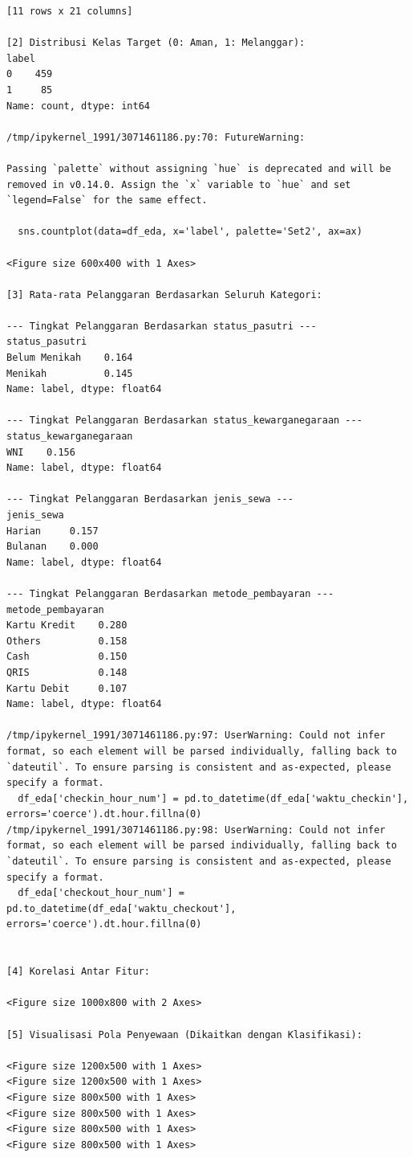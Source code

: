 \begin{lstlisting}[caption={Output 15}]
[11 rows x 21 columns]

[2] Distribusi Kelas Target (0: Aman, 1: Melanggar):
label
0    459
1     85
Name: count, dtype: int64

/tmp/ipykernel_1991/3071461186.py:70: FutureWarning: 

Passing `palette` without assigning `hue` is deprecated and will be removed in v0.14.0. Assign the `x` variable to `hue` and set `legend=False` for the same effect.

  sns.countplot(data=df_eda, x='label', palette='Set2', ax=ax)

<Figure size 600x400 with 1 Axes>

[3] Rata-rata Pelanggaran Berdasarkan Seluruh Kategori:

--- Tingkat Pelanggaran Berdasarkan status_pasutri ---
status_pasutri
Belum Menikah    0.164
Menikah          0.145
Name: label, dtype: float64

--- Tingkat Pelanggaran Berdasarkan status_kewarganegaraan ---
status_kewarganegaraan
WNI    0.156
Name: label, dtype: float64

--- Tingkat Pelanggaran Berdasarkan jenis_sewa ---
jenis_sewa
Harian     0.157
Bulanan    0.000
Name: label, dtype: float64

--- Tingkat Pelanggaran Berdasarkan metode_pembayaran ---
metode_pembayaran
Kartu Kredit    0.280
Others          0.158
Cash            0.150
QRIS            0.148
Kartu Debit     0.107
Name: label, dtype: float64

/tmp/ipykernel_1991/3071461186.py:97: UserWarning: Could not infer format, so each element will be parsed individually, falling back to `dateutil`. To ensure parsing is consistent and as-expected, please specify a format.
  df_eda['checkin_hour_num'] = pd.to_datetime(df_eda['waktu_checkin'], errors='coerce').dt.hour.fillna(0)
/tmp/ipykernel_1991/3071461186.py:98: UserWarning: Could not infer format, so each element will be parsed individually, falling back to `dateutil`. To ensure parsing is consistent and as-expected, please specify a format.
  df_eda['checkout_hour_num'] = pd.to_datetime(df_eda['waktu_checkout'], errors='coerce').dt.hour.fillna(0)


[4] Korelasi Antar Fitur:

<Figure size 1000x800 with 2 Axes>

[5] Visualisasi Pola Penyewaan (Dikaitkan dengan Klasifikasi):

<Figure size 1200x500 with 1 Axes>
<Figure size 1200x500 with 1 Axes>
<Figure size 800x500 with 1 Axes>
<Figure size 800x500 with 1 Axes>
<Figure size 800x500 with 1 Axes>
<Figure size 800x500 with 1 Axes>


\end{lstlisting}

